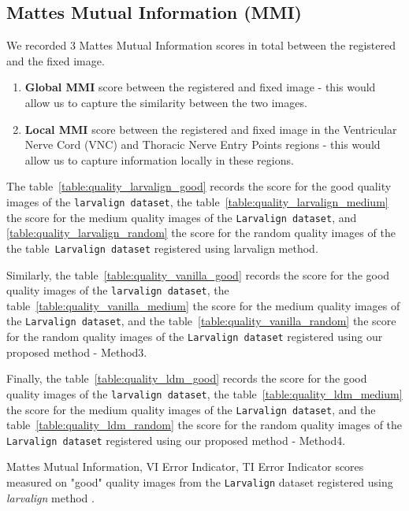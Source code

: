 \documentclass{report}
\begin{document}
	\subsection{Mattes Mutual Information (MMI)}
	We recorded 3 Mattes Mutual Information scores in total between the registered and the fixed image.
	\begin{enumerate}
		\item \textbf{Global MMI} score between the registered and fixed image - this would allow us to capture the similarity between the two images.
		\item \textbf{Local MMI} score between the registered and fixed image in the Ventricular Nerve Cord (VNC) and Thoracic Nerve Entry Points regions - this would allow us to capture information locally in these regions.
	\end{enumerate}
	
	The table~\ref{table:quality_larvalign_good} records the score for the good quality images of the \texttt{larvalign dataset}, the table~\ref{table:quality_larvalign_medium} the score for the medium quality images of the \texttt{Larvalign dataset}, and \ref{table:quality_larvalign_random} the score for the random quality images of the the table~\texttt{Larvalign dataset} registered using larvalign method.
	
	Similarly, the table~\ref{table:quality_vanilla_good} records the score for the good quality images of the \texttt{larvalign dataset}, the table~\ref{table:quality_vanilla_medium} the score for the medium quality images of the \texttt{Larvalign dataset}, and the table~\ref{table:quality_vanilla_random} the score for the random quality images of the \texttt{Larvalign dataset} registered using our proposed method - Method3.
	
	Finally, the table~\ref{table:quality_ldm_good} records the score for the good quality images of the \texttt{larvalign dataset}, the table~\ref{table:quality_ldm_medium} the score for the medium quality images of the \texttt{Larvalign dataset}, and the table~\ref{table:quality_ldm_random} the score for the random quality images of the \texttt{Larvalign dataset} registered using our proposed method - Method4.

	\begin{table}[H]
		\centering
		
		\caption{Mattes Mutual Information, VI Error Indicator, TI Error Indicator scores measured on "good" quality images from the \texttt{Larvalign} dataset registered using \emph{larvalign} method \cite{larvalign}.}
		\label{table:quality_larvalign_good}
	\end{table}
\end{document}
